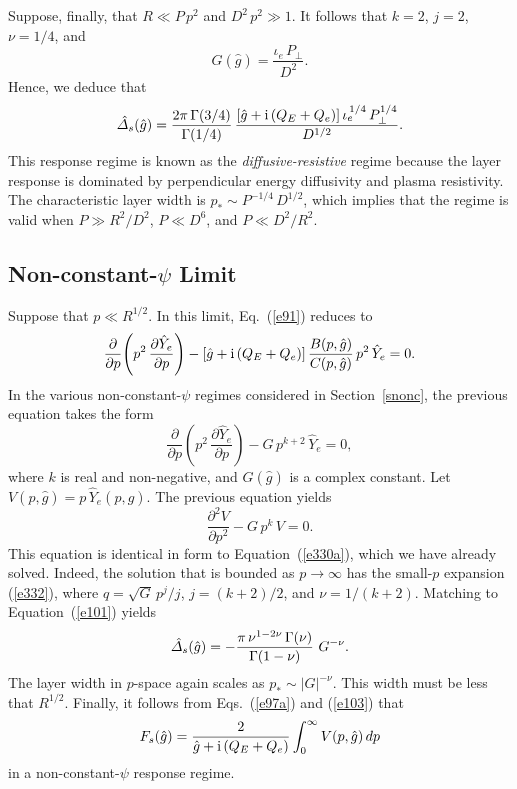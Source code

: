 \documentclass[12pt,prb,aps]{revtex4-1}
\begin{document}
Suppose, finally, that $R\ll P\,p^2$ and $D^2\,p^2\gg 1$. It follows that $k=2$, $j=2$, $\nu=1/4$, and
\begin{equation}
G(\hat{g}) = \frac{\iota_e\,P_\perp}{D^2}.
\end{equation}
Hence, we deduce that 
\begin{equation}\label{dr}
\hat{\mit\Delta}_s(\hat{g})= \frac{2\pi\,\Gamma(3/4)}{\Gamma(1/4)}\,\frac{[\hat{g}+{\rm i}\,(Q_E+Q_e)]\,\iota_e^{\,1/4}\,P_\perp^{1/4}}{D^{1/2}}.
\end{equation}
This response regime is known as the {\em diffusive-resistive}\/ regime because the layer 
response is dominated by perpendicular energy diffusivity and plasma resistivity. \cite{err3} The characteristic
layer width is $p_\ast \sim P^{-1/4}\,D^{1/2}$, which implies that the regime is valid when $P\gg R^2/D^2$,
$P\ll D^6$, and $P\ll D^2/R^2$. 

\subsection{Non-constant-$\psi$ Limit}\label{sncp}
Suppose that $p\ll R^{1/2}$. In this limit, Eq.~(\ref{e91}) reduces to 
\begin{equation}
\frac{\partial}{\partial p}\!\left(p^2\,\frac{\partial\hat{Y}_e}{\partial p}\right)-[\hat{g}+{\rm i}\,(Q_E+Q_e)]\,\frac{B(p,\hat{g})}{C(p,\hat{g})}\,p^2\,\hat{Y}_e=0.
\end{equation}
In the various non-constant-$\psi$ regimes considered in Section~\ref{snonc}, the previous equation takes the form
\begin{equation}
\frac{\partial}{\partial p}\!\left(p^2\,\frac{\partial \hat{Y}_e}{\partial p}\right)-G\,p^{k+2}\,\hat{Y}_e = 0,
\end{equation}
where $k$ is real and non-negative, and $G(\hat{g})$ is a complex constant. Let $V(p,\hat{g})=p\,\hat{Y}_e(p,\hat{g})$. The previous equation
yields
\begin{equation}
\frac{\partial^2 V}{\partial p^2} - G\,p^k\,V = 0.
\end{equation}
This equation is identical in form to Equation~(\ref{e330a}), which we have already solved. Indeed, the solution that
is bounded as $p\rightarrow\infty$ has the small-$p$ expansion (\ref{e332}), where $q=\!\sqrt{G}\,p^j/j$, 
$j=(k+2)/2$, and $\nu=1/(k+2)$. Matching to Equation~(\ref{e101}) yields
\begin{equation}
\hat{\mit\Delta}_s(\hat{g})= -\frac{\pi\,\nu^{1-2\nu}\,\Gamma(\nu)}{\Gamma(1-\nu)}\,\,G^{-\nu}.
\end{equation}
The layer width in $p$-space again scales as $p_\ast\sim |G|^{-\nu}$. This width must be
less that $R^{1/2}$.  
Finally, it follows from Eqs.~(\ref{e97a}) and (\ref{e103}) that
\begin{equation}
F_s(\hat{g}) = \frac{2}{\hat{g}+{\rm i}\,(Q_E+Q_e)}\int_0^\infty V(p,\hat{g})\,dp
\end{equation}
in a non-constant-$\psi$ response regime. 
\end{document}
